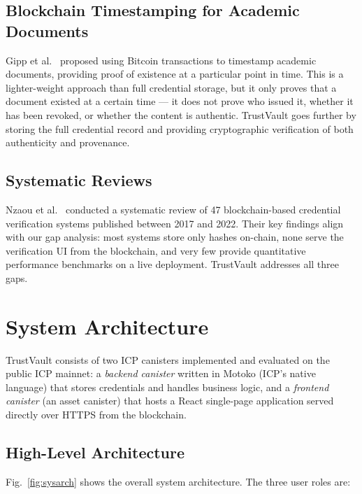 \documentclass[journal]{IEEEtran}
\begin{document}
\subsection{Blockchain Timestamping for Academic Documents}

Gipp et al.~\cite{gipp2015decentralized} proposed using Bitcoin transactions to timestamp academic documents, providing proof of existence at a particular point in time. This is a lighter-weight approach than full credential storage, but it only proves that a document existed at a certain time — it does not prove who issued it, whether it has been revoked, or whether the content is authentic. TrustVault goes further by storing the full credential record and providing cryptographic verification of both authenticity and provenance.

\subsection{Systematic Reviews}

Nzaou et al.~\cite{nzaou2022credential} conducted a systematic review of 47 blockchain-based credential verification systems published between 2017 and 2022. Their key findings align with our gap analysis: most systems store only hashes on-chain, none serve the verification UI from the blockchain, and very few provide quantitative performance benchmarks on a live deployment. TrustVault addresses all three gaps.

\section{System Architecture}
\label{sec:architecture}

TrustVault consists of two ICP canisters implemented and evaluated on the public ICP mainnet: a \emph{backend canister} written in Motoko (ICP's native language) that stores credentials and handles business logic, and a \emph{frontend canister} (an asset canister) that hosts a React single-page application served directly over HTTPS from the blockchain.

\subsection{High-Level Architecture}

Fig.~\ref{fig:sysarch} shows the overall system architecture. The three user roles are:
\end{document}
